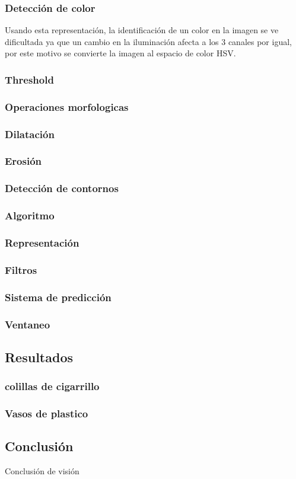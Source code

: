 	\subsubsection{Detecci\'on de color}
Usando esta representación, la identificación de un color en la imagen se ve dificultada ya que un cambio en la iluminación afecta a los 3 canales por igual, por este motivo se convierte la imagen al espacio de color HSV.
	\subsubsection{Threshold}
	\subsubsection{Operaciones morfologicas}
		\subsubsection*{Dilataci\'on}
		\subsubsection*{Erosi\'on}
	\subsubsection{Detecci\'on de contornos}
		\subsubsection*{Algoritmo}
		\subsubsection*{Representaci\'on}
	\subsubsection{Filtros}
	\subsubsection{Sistema de predicci\'on}
	\subsubsection{Ventaneo}
	
	
\subsection{Resultados}
\subsubsection{colillas de cigarrillo}
\subsubsection{Vasos de plastico}
	
	
\subsection{Conclusi\'on}
Conclusi\'on de visi\'on

